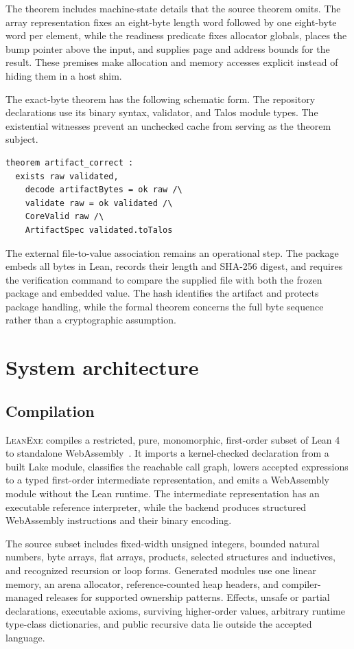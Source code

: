 \documentclass[11pt]{article}
\newcommand{\leanexe}{\textsc{LeanExe}}
\begin{document}
The theorem includes machine-state details that the source theorem omits.  The array representation fixes an eight-byte length word followed by one eight-byte word per element, while the readiness predicate fixes allocator globals, places the bump pointer above the input, and supplies page and address bounds for the result.  These premises make allocation and memory accesses explicit instead of hiding them in a host shim.

The exact-byte theorem has the following schematic form.  The repository declarations use its binary syntax, validator, and Talos module types.  The existential witnesses prevent an unchecked cache from serving as the theorem subject.

\begin{verbatim}
theorem artifact_correct :
  exists raw validated,
    decode artifactBytes = ok raw /\
    validate raw = ok validated /\
    CoreValid raw /\
    ArtifactSpec validated.toTalos
\end{verbatim}

The external file-to-value association remains an operational step.  The package embeds all bytes in Lean, records their length and SHA-256 digest, and requires the verification command to compare the supplied file with both the frozen package and embedded value.  The hash identifies the artifact and protects package handling, while the formal theorem concerns the full byte sequence rather than a cryptographic assumption.

\section{System architecture}

\subsection{Compilation}

\leanexe{} compiles a restricted, pure, monomorphic, first-order subset of Lean 4 to standalone WebAssembly~\cite{LeanExeSoftware,deMoura2021Lean4}.  It imports a kernel-checked declaration from a built Lake module, classifies the reachable call graph, lowers accepted expressions to a typed first-order intermediate representation, and emits a WebAssembly module without the Lean runtime.  The intermediate representation has an executable reference interpreter, while the backend produces structured WebAssembly instructions and their binary encoding.

The source subset includes fixed-width unsigned integers, bounded natural numbers, byte arrays, flat arrays, products, selected structures and inductives, and recognized recursion or loop forms.  Generated modules use one linear memory, an arena allocator, reference-counted heap headers, and compiler-managed releases for supported ownership patterns.  Effects, unsafe or partial declarations, executable axioms, surviving higher-order values, arbitrary runtime type-class dictionaries, and public recursive data lie outside the accepted language.
\end{document}
